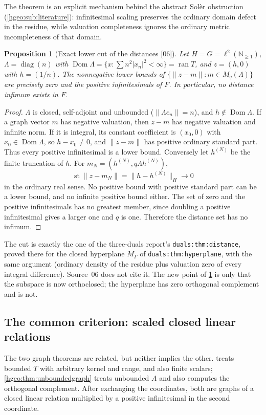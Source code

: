 \documentclass[11pt,letterpaper]{article}
\numberwithin{equation}{section}
\newtheorem{proposition}[proposition]{Proposition}
\theoremstyle{definition}
\theoremstyle{remark}
\newcommand{\N}{\mathbb N}
\newcommand{\F}{F}
\newcommand{\ran}{\operatorname{ran}}
\newcommand{\Dom}{\operatorname{Dom}}
\newcommand{\st}{\operatorname{st}}
\newcommand{\diag}{\operatorname{diag}}
\newcommand{\norm}[1]{\lVert #1\rVert}
\newcommand{\abs}[1]{\lvert #1\rvert}
\newcommand{\src}[1]{\textup{\textsf{\small[#1]}}}
\newcommand{\replabel}[1]{\nolinkurl{#1}}
\begin{document}
The theorem is an explicit mechanism behind the abstract Sol\`er
obstruction (\cref{hgeo:sub:literature}): infinitesimal scaling preserves
the ordinary domain defect in the residue, while valuation completeness
ignores the ordinary metric incompleteness of that domain.

\begin{proposition}[Exact lower cut of the distances \src{06}]
\label{hgeo:prop:distancecut}
Let $H=G=\ell^2(\N_{\ge1})$, $\Lambda=\diag(n)$ with
$\Dom\Lambda=\{x:\sum n^2\abs{x_n}^2<\infty\}=\ran T$, and
$z=(h,0)$ with $h=(1/n)$. The nonnegative lower bounds of
$\{\norm{z-m}:m\in M_q(\Lambda)\}$ are precisely zero and the positive
infinitesimals of $\F$. In particular, no distance infimum exists in $\F$.
\end{proposition}
\begin{proof}
$\Lambda$ is closed, self-adjoint and unbounded ($\norm{\Lambda e_n}=n$), and
$h\notin\Dom\Lambda$. If a graph vector $m$ has negative valuation, then
$z-m$ has negative valuation and infinite norm. If it is integral, its
constant coefficient is $(x_0,0)$ with $x_0\in\Dom\Lambda$, so
$h-x_0\ne0$, and $\norm{z-m}$ has positive ordinary standard part. Thus every
positive infinitesimal is a lower bound. Conversely let $h^{(N)}$ be the
finite truncation of $h$. For $m_N=(h^{(N)},q\Lambda h^{(N)})$,
\[
 \st\norm{z-m_N}=\norm{h-h^{(N)}}_H\longrightarrow0
\]
in the ordinary real sense. No positive bound with positive standard part
can be a lower bound, and no infinite positive bound either. The set of zero
and the positive infinitesimals has no greatest member, since doubling a
positive infinitesimal gives a larger one and $q$ is one. Therefore the
distance set has no infimum.
\end{proof}

The cut is exactly the one of the three-duals report's
\replabel{duals:thm:distance}, proved there for the closed hyperplane
$M_\Gamma$ of \replabel{duals:thm:hyperplane}, with the same argument
(ordinary density of the residue plus valuation zero of every integral
difference). Source~06 does not cite it. The new point of
\cref{hgeo:prop:distancecut} is only that the subspace is now orthoclosed;
the hyperplane has zero orthogonal complement and is not.

\subsection{The common criterion: scaled closed linear relations}
\label{hgeo:sub:relation}
The two graph theorems are related, but neither implies the other.
 treats bounded $T$ with arbitrary kernel and
range, and also finite scalars; \cref{hgeo:thm:unboundedgraph} treats
unbounded $A$ and also computes the orthogonal complement. After exchanging
the coordinates, both are graphs of a closed linear relation multiplied by a
positive infinitesimal in the second coordinate.
\end{document}
